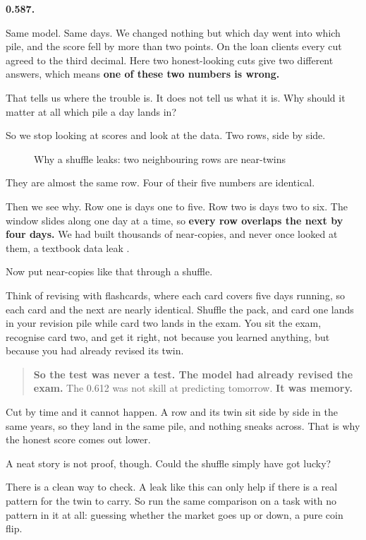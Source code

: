 \documentclass[11pt]{article} %
\begin{document}
\textbf{0.587.}

Same model. Same days. We changed nothing but which day went into which pile, and the score fell by more than two points. On the loan clients every cut agreed to the third decimal. Here two honest-looking cuts give two different answers, which means \textbf{one of these two numbers is wrong.}

That tells us where the trouble is. It does not tell us what it is. Why should it matter at all which pile a day lands in?

So we stop looking at scores and look at the data. Two rows, side by side.

\begin{figure}[htbp]
\centering

\caption{Why a shuffle leaks: two neighbouring rows are near-twins}
\end{figure}


They are almost the same row. Four of their five numbers are identical.

Then we see why. Row one is days one to five. Row two is days two to six. The window slides along one day at a time, so \textbf{every row overlaps the next by four days.} We had built thousands of near-copies, and never once looked at them, a textbook data leak \cite{kaufman:2012}.

Now put near-copies like that through a shuffle.

Think of revising with flashcards, where each card covers five days running, so each card and the next are nearly identical. Shuffle the pack, and card one lands in your revision pile while card two lands in the exam. You sit the exam, recognise card two, and get it right, not because you learned anything, but because you had already revised its twin.


\begin{quote}
\textbf{So the test was never a test. The model had already revised the exam.} The 0.612 was not skill at predicting tomorrow. \textbf{It was memory.}
\end{quote}


Cut by time and it cannot happen. A row and its twin sit side by side in the same years, so they land in the same pile, and nothing sneaks across. That is why the honest score comes out lower.

A neat story is not proof, though. Could the shuffle simply have got lucky?

There is a clean way to check. A leak like this can only help if there is a real pattern for the twin to carry. So run the same comparison on a task with no pattern in it at all: guessing whether the market goes up or down, a pure coin flip.
\end{document}
